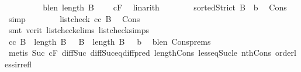 \begin{isabellebody}
\ \ \ \ \ \ \isamarkupfalse%
\ \isamarkupfalse%
\ blen{\isacharcolon}{\kern0pt}\ {\isachardoublequoteopen}length\ B\ {\isasymge}\ {}{\isachardoublequoteclose}\ \isamarkupfalse%
\ cF\ \isamarkupfalse%
\ linarith\isanewline
\ \ \ \ \ \ \isamarkupfalse%
\ {}{\isacharcolon}{\kern0pt}{\isachardoublequoteopen}sortedStrict\ {\isacharparenleft}{\kern0pt}B\ {\isacharat}{\kern0pt}\ {\isacharbrackleft}{\kern0pt}b{\isacharbrackright}{\kern0pt}{\isacharparenright}{\kern0pt}{\isachardoublequoteclose}\ \isamarkupfalse%
\ Cons\ \isamarkupfalse%
\ simp\isanewline
\ \ \ \ \ \ \isamarkupfalse%
\ {}{\isacharcolon}{\kern0pt}{\isachardoublequoteopen}list{\isacharunderscore}{\kern0pt}check\ cc\ B{\isachardoublequoteclose}\ \isamarkupfalse%
\ Cons\isanewline
\ \ \ \ \ \ \ \ \isamarkupfalse%
\ {\isacharparenleft}{\kern0pt}smt\ {\isacharparenleft}{\kern0pt}verit{\isacharparenright}{\kern0pt}\ list{\isacharunderscore}{\kern0pt}check{\isachardot}{\kern0pt}elims{\isacharparenleft}{\kern0pt}{}{\isacharparenright}{\kern0pt}\ list{\isacharunderscore}{\kern0pt}check{\isachardot}{\kern0pt}simps{\isacharparenleft}{\kern0pt}{}{\isacharparenright}{\kern0pt}{\isacharparenright}{\kern0pt}\isanewline
\ \ \ \ \ \ \isamarkupfalse%
\ {}{\isacharcolon}{\kern0pt}{\isachardoublequoteopen}cc\ {\isacharparenleft}{\kern0pt}B\ {\isacharbang}{\kern0pt}\ {\isacharparenleft}{\kern0pt}length\ B\ {\isacharminus}{\kern0pt}\ {}{\isacharparenright}{\kern0pt}{\isacharparenright}{\kern0pt}\ {\isacharparenleft}{\kern0pt}B\ {\isacharbang}{\kern0pt}\ {\isacharparenleft}{\kern0pt}length\ B\ {\isacharminus}{\kern0pt}\ {}{\isacharparenright}{\kern0pt}{\isacharparenright}{\kern0pt}\ b{\isachardoublequoteclose}\ \isamarkupfalse%
\ blen\ Cons{\isachardot}{\kern0pt}prems\isanewline
\ \ \ \ \ \ \ \ \isamarkupfalse%
\ {\isacharparenleft}{\kern0pt}metis\ Suc{\isacharunderscore}{\kern0pt}{}\ cF\ diff{\isacharunderscore}{\kern0pt}Suc{\isacharunderscore}{\kern0pt}{}\ diff{\isacharunderscore}{\kern0pt}Suc{\isacharunderscore}{\kern0pt}eq{\isacharunderscore}{\kern0pt}diff{\isacharunderscore}{\kern0pt}pred\ length{\isacharunderscore}{\kern0pt}Cons\ less{\isacharunderscore}{\kern0pt}eq{\isacharunderscore}{\kern0pt}Suc{\isacharunderscore}{\kern0pt}le\ nth{\isacharunderscore}{\kern0pt}Cons{\isacharprime}{\kern0pt}\ order{\isacharunderscore}{\kern0pt}less{\isacharunderscore}{\kern0pt}irrefl\isanewline

\end{isabellebody}
